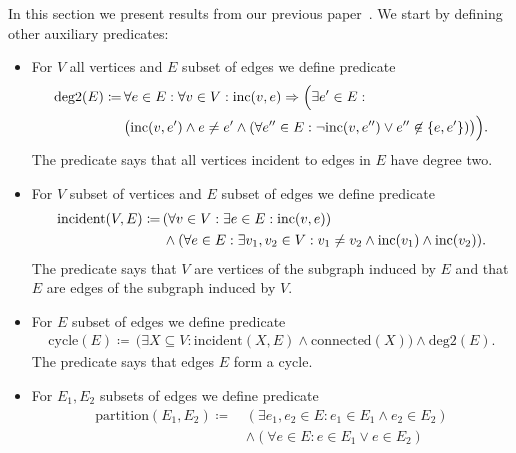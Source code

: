 
In this section we present results from our previous paper~\cite{my_paper}.
We start by defining other auxiliary predicates:
%
\begin{itemize}
	\item For \( V \) all vertices and \( E \) subset of edges we define predicate
	      \begin{align*}
		      \text{deg2}(E) \coloneqq \,
		       & \forall e \in E : \forall v \in V : \text{inc} (v, e) \Rightarrow \Big( \exists e' \in E : \\
		       & \big( \text{inc} (v, e') \land e \ne e' \land (\forall e^{\prime\prime} \in E :
				      \lnot \text{inc} (v, e^{\prime\prime}) \lor e^{\prime\prime} \not\in \{e, e'\}) \big) \Big).
	      \end{align*}
	      The predicate says that all vertices incident to edges in \( E \) have degree two.
	\item For \( V \) subset of vertices and \( E \) subset of edges we define predicate
	      \begin{align*}
		      \text{incident}(V, E) \coloneqq \,
		       & (\forall v \in V : \exists e \in E : \text{inc} (v, e))                                                 \\
		       & \land (\forall e \in E : \exists v_1, v_2 \in V : v_1 \ne v_2 \land \text{inc} (v_1) \land \text{inc} (v_2)).
	      \end{align*}
	      The predicate says that \( V \) are vertices of the subgraph induced by \( E \)
	      and that \( E \) are edges of the subgraph induced by \( V \).
	\item For \( E \) subset of edges we define predicate
	      \begin{align*}
		      \text{cycle}(E) \coloneqq \,
		      \big( \exists X \subseteq V : \text{incident}(X, E) \land \text{connected}(X) \big)
		      \land \text{deg2}(E).
	      \end{align*}
	      The predicate says that edges \( E \) form a cycle.
	\item For \( E_1, E_2 \) subsets of edges we define predicate
	      \begin{align*}
		      \text{partition}(E_1, E_2) \coloneqq \, & (\exists e_1, e_2 \in E : e_1 \in E_1 \land e_2 \in E_2 )    \\
		                                              & \land (\forall e \in E : e \in E_1 \lor e \in E_2 )          \\

\end{align*}
\end{itemize}
